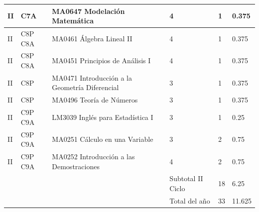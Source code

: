 \begin{longtable}[c]{|p{0.8cm}|p{1.8cm}|p{6.8cm}|p{1.5cm}|p{1.3cm}|p{1.5cm}|}
II & C7A & MA0647 Modelación Matemática & 4 & 1 & 0.375 \\ \hline
II & C8P C8A & MA0461 Álgebra Lineal II & 4 & 1 & 0.375 \\ \hline
II & C8P C8A & MA0451 Principios de Análisis I & 4 & 1 & 0.375 \\ \hline
II & C8P & MA0471 Introducción a la Geometría Diferencial & 3 & 1 & 0.375 \\ \hline
II & C8P & MA0496 Teoría de Números & 3 & 1 & 0.375 \\ \hline
II & C9P C9A & LM3039 Inglés para Estadística I & 3 & 1 & 0.25 \\ \hline
II & C9P C9A & MA0251 Cálculo en una Variable & 3 & 2 & 0.75 \\ \hline
II & C9P C9A & MA0252 Introducción a las Demostraciones & 4 & 2 & 0.75 \\ \hline
 &  &  & Subtotal II Ciclo & 18 & 6.25 \\ \hline
 &  &  & Total del año & 33 & 11.625 \\ \hline
\end{longtable}

